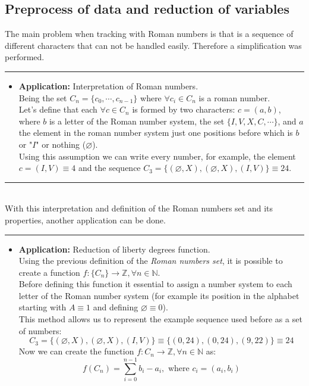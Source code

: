 \documentclass[a4paper, 11pt]{article}
\begin{document}
\subsection{Preprocess of data and reduction of variables}
The main problem when tracking with Roman numbers is that is a sequence of different characters that can not be handled easily. Therefore a simplification was performed.\\
\rule{\linewidth}{0.4pt}
    \begin{itemize}
        \item \textbf{Application:} Interpretation of Roman numbers.\\
 Being the set $C_n = \{c_0, \cdots, c_{n-1} \}$ where $\forall c_i \in C_n$ is a roman number.\\ 
 Let's define that each $\forall c \in C_n$ is formed by two characters: $c = (a,b)$, where $b$ is a letter of the Roman number system, the set $\{I, V, X, C, \cdots \}$, and $a$ the element in the roman number system just one positions before which is $b$ or "$I$" or nothing ($\varnothing$).\\
 Using this assumption we can write every number, for example, the element\\
        $c = (I,V) \equiv 4$ and the sequence $C_3 = \{ (\varnothing, X), (\varnothing, X), (I,V) \} \equiv 24$.
    \end{itemize}
\rule{\linewidth}{0.4pt}\\
With this interpretation and definition of the Roman numbers set and its properties, another application can be done.\\
\rule{\linewidth}{0.4pt}
    \begin{itemize}
        \item \textbf{Application:} Reduction of liberty degrees function.\\
 Using the previous definition of the \textit{Roman numbers set}, it is possible to create a function $f:\{C_n\}\rightarrow \mathbb{Z}, \forall n \in \mathbb{N}$.\\
 Before defining this function it essential to assign a number system to each letter of the Roman number system (for example its position in the alphabet starting with $A\equiv1$ and defining $\varnothing \equiv 0$).\\
 This method allows us to represent the example sequence used before as a set of numbers: 
        $$C_3 = \{ (\varnothing, X), (\varnothing, X), (I,V) \} \equiv \{ (0,24), (0,24), (9,22) \} \equiv 24$$
 Now we can create the function $f:C_n\rightarrow \mathbb{Z}, \forall n \in \mathbb{N}$ as:
        $$ f(C_n) = \sum_{i = 0}^{n-1} b_i-a_i, \text{ where } c_i = (a_i, b_i) $$
    \end{itemize}
\end{document}
